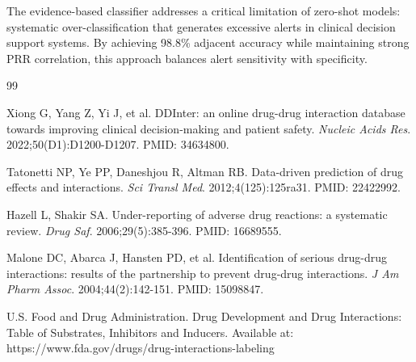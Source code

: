 \documentclass[11pt,a4paper]{article}
\begin{document}
The evidence-based classifier addresses a critical limitation of zero-shot models: systematic over-classification that generates excessive alerts in clinical decision support systems. By achieving 98.8\% adjacent accuracy while maintaining strong PRR correlation, this approach balances alert sensitivity with specificity.

\begin{thebibliography}{99}

Xiong G, Yang Z, Yi J, et al.
DDInter: an online drug-drug interaction database towards improving clinical decision-making and patient safety.
\textit{Nucleic Acids Res}. 2022;50(D1):D1200-D1207. PMID: 34634800.

Tatonetti NP, Ye PP, Daneshjou R, Altman RB.
Data-driven prediction of drug effects and interactions.
\textit{Sci Transl Med}. 2012;4(125):125ra31. PMID: 22422992.

Hazell L, Shakir SA.
Under-reporting of adverse drug reactions: a systematic review.
\textit{Drug Saf}. 2006;29(5):385-396. PMID: 16689555.

Malone DC, Abarca J, Hansten PD, et al.
Identification of serious drug-drug interactions: results of the partnership to prevent drug-drug interactions.
\textit{J Am Pharm Assoc}. 2004;44(2):142-151. PMID: 15098847.

U.S. Food and Drug Administration.
Drug Development and Drug Interactions: Table of Substrates, Inhibitors and Inducers.
Available at: https://www.fda.gov/drugs/drug-interactions-labeling

\end{thebibliography}
\end{document}
